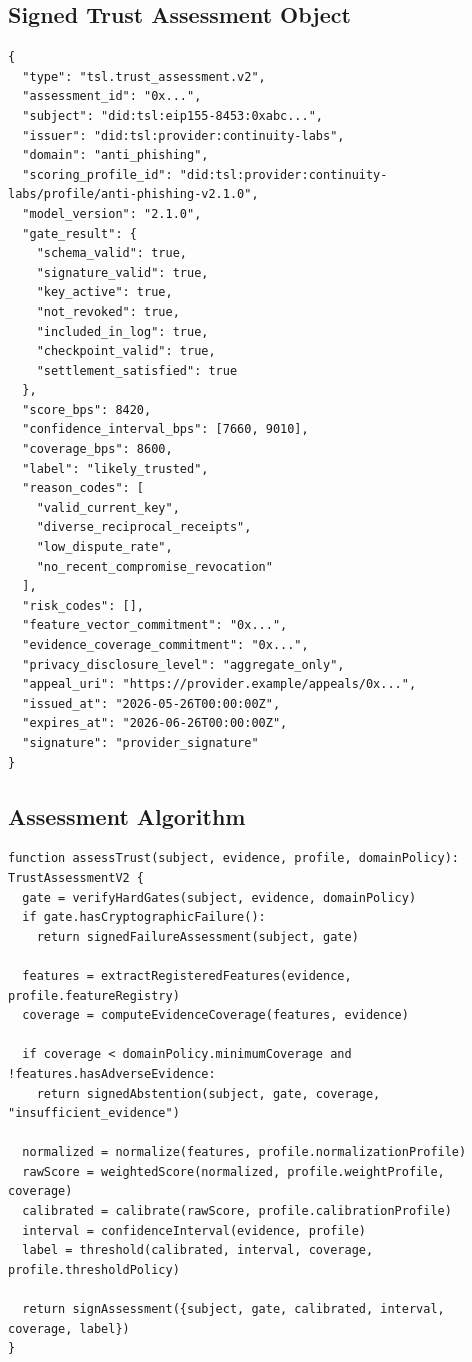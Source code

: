 \documentclass[11pt]{article}
\begin{document}
\subsection{Signed Trust Assessment Object}

\begin{lstlisting}[style=tslcode]
{
  "type": "tsl.trust_assessment.v2",
  "assessment_id": "0x...",
  "subject": "did:tsl:eip155-8453:0xabc...",
  "issuer": "did:tsl:provider:continuity-labs",
  "domain": "anti_phishing",
  "scoring_profile_id": "did:tsl:provider:continuity-labs/profile/anti-phishing-v2.1.0",
  "model_version": "2.1.0",
  "gate_result": {
    "schema_valid": true,
    "signature_valid": true,
    "key_active": true,
    "not_revoked": true,
    "included_in_log": true,
    "checkpoint_valid": true,
    "settlement_satisfied": true
  },
  "score_bps": 8420,
  "confidence_interval_bps": [7660, 9010],
  "coverage_bps": 8600,
  "label": "likely_trusted",
  "reason_codes": [
    "valid_current_key",
    "diverse_reciprocal_receipts",
    "low_dispute_rate",
    "no_recent_compromise_revocation"
  ],
  "risk_codes": [],
  "feature_vector_commitment": "0x...",
  "evidence_coverage_commitment": "0x...",
  "privacy_disclosure_level": "aggregate_only",
  "appeal_uri": "https://provider.example/appeals/0x...",
  "issued_at": "2026-05-26T00:00:00Z",
  "expires_at": "2026-06-26T00:00:00Z",
  "signature": "provider_signature"
}
\end{lstlisting}

\subsection{Assessment Algorithm}

\begin{lstlisting}[style=tslcode]
function assessTrust(subject, evidence, profile, domainPolicy): TrustAssessmentV2 {
  gate = verifyHardGates(subject, evidence, domainPolicy)
  if gate.hasCryptographicFailure():
    return signedFailureAssessment(subject, gate)

  features = extractRegisteredFeatures(evidence, profile.featureRegistry)
  coverage = computeEvidenceCoverage(features, evidence)

  if coverage < domainPolicy.minimumCoverage and !features.hasAdverseEvidence:
    return signedAbstention(subject, gate, coverage, "insufficient_evidence")

  normalized = normalize(features, profile.normalizationProfile)
  rawScore = weightedScore(normalized, profile.weightProfile, coverage)
  calibrated = calibrate(rawScore, profile.calibrationProfile)
  interval = confidenceInterval(evidence, profile)
  label = threshold(calibrated, interval, coverage, profile.thresholdPolicy)

  return signAssessment({subject, gate, calibrated, interval, coverage, label})
}
\end{lstlisting}
\end{document}
